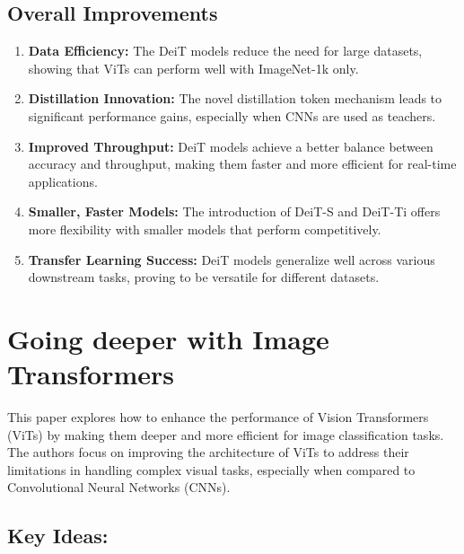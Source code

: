 \documentclass{report}
\begin{document}
	\section{Overall Improvements}
	\begin{enumerate}
		\item 
		\textbf{Data Efficiency:} The DeiT models reduce the need for large datasets, showing that ViTs can perform well with ImageNet-1k only.
		
		\item 
		\textbf{Distillation Innovation:} The novel distillation token mechanism leads to significant performance gains, especially when CNNs are used as teachers.
		
		\item 
		\textbf{Improved Throughput:} DeiT models achieve a better balance between accuracy and throughput, making them faster and more efficient for real-time applications.
		
		\item 
		\textbf{Smaller, Faster Models:} The introduction of DeiT-S and DeiT-Ti offers more flexibility with smaller models that perform competitively.
		
		\item 
		\textbf{Transfer Learning Success:} DeiT models generalize well across various downstream tasks, proving to be versatile for different datasets.
	\end{enumerate}
	
	
	

	
	
	
	
	
	
	
	
	
	
	
	\chapter{Going deeper with Image Transformers \cite{DBLP:journals/corr/abs-2103-17239}}
	This paper explores how to enhance the performance of Vision Transformers (ViTs) by making them deeper and more efficient for image classification tasks. The authors focus on improving the architecture of ViTs to address their limitations in handling complex visual tasks, especially when compared to Convolutional Neural Networks (CNNs).
	
	
	\section{Key Ideas:}
\end{document}
